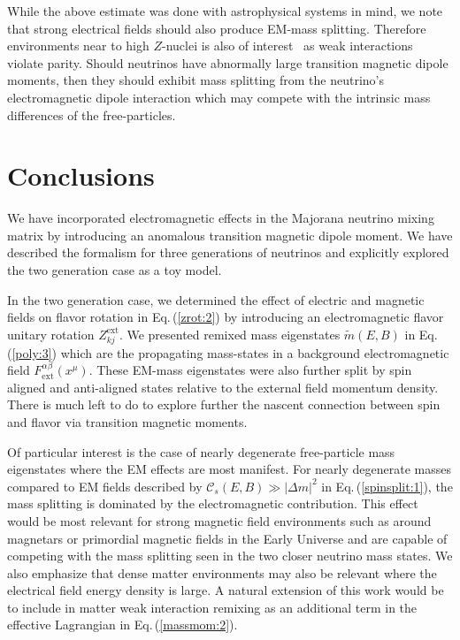 \documentclass{ws-ijmpa}
\newcommand{\req}[1]{Eq.\,(\ref{#1})}
\begin{document}
While the above estimate was done with astrophysical systems in mind, we note that strong electrical fields should also produce EM-mass splitting. Therefore environments near to high $Z$-nuclei is also of interest~\cite{Bouchiat:1974kt,Bouchiat:1997mj,Safronova:2017xyt} as weak interactions violate parity. Should neutrinos have abnormally large transition magnetic dipole moments, then they should exhibit mass splitting from the neutrino's electromagnetic dipole interaction which may compete with the intrinsic mass differences of the free-particles.

\section{Conclusions}
\label{sec:conclusions}
We have incorporated electromagnetic effects in the Majorana neutrino mixing matrix by introducing an anomalous transition magnetic dipole moment. We have described the formalism for three generations of neutrinos and explicitly explored the two generation case as a toy model. 

In the two generation case, we determined the effect of electric and magnetic fields on flavor rotation in \req{zrot:2} by introducing an electromagnetic flavor unitary rotation $Z_{kj}^\mathrm{ext}$. We presented remixed mass eigenstates $\widetilde m(E,B)$ in \req{poly:3} which are the propagating mass-states in a background electromagnetic field $F^{\alpha\beta}_\mathrm{ext}(x^{\mu})$. These EM-mass eigenstates were also further split by spin aligned and anti-aligned states relative to the external field momentum density. There is much left to do to explore further the nascent connection between spin and flavor via transition magnetic moments. 

Of particular interest is the case of nearly degenerate free-particle mass eigenstates where the EM effects are most manifest. For nearly degenerate masses compared to EM fields described by $\mathcal{C}_{s}(E,B)\gg|\Delta m|^{2}$ in \req{spinsplit:1}, the mass splitting is dominated by the electromagnetic contribution. This effect would be most relevant for strong magnetic field environments such as around magnetars or primordial magnetic fields in the Early Universe and are capable of competing with the mass splitting seen in the two closer neutrino mass states. We also emphasize that dense matter environments may also be relevant where the electrical field energy density is large. A natural extension of this work would be to include in matter weak interaction remixing as an additional term in the effective Lagrangian in \req{massmom:2}.
 
\end{document}
